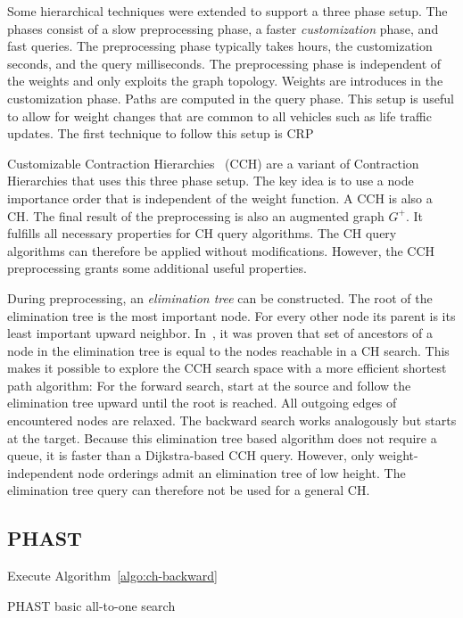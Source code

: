 \documentclass[manuscript,review]{acmart}
\begin{document}
Some hierarchical techniques were extended to support a three phase setup.
The phases consist of a slow preprocessing phase, a faster \emph{customization} phase, and fast queries.
The preprocessing phase typically takes hours, the customization seconds, and the query milliseconds.
The preprocessing phase is independent of the weights and only exploits the graph topology.
Weights are introduces in the customization phase.
Paths are computed in the query phase.
This setup is useful to allow for weight changes that are common to all vehicles such as life traffic updates.
The first technique to follow this setup is CRP~\cite{dgpw-crprn-13}

Customizable Contraction Hierarchies~\cite{dsw-cch-15} (CCH) are a variant of Contraction Hierarchies that uses this three phase setup.
The key idea is to use a node importance order that is independent of the weight function.
A CCH is also a CH.
The final result of the preprocessing is also an augmented graph $G^+$.
It fulfills all necessary properties for CH query algorithms.
The CH query algorithms can therefore be applied without modifications.
However, the CCH preprocessing grants some additional useful properties.

During preprocessing, an \emph{elimination tree} can be constructed.
The root of the elimination tree is the most important node.
For every other node its parent is its least important upward neighbor.
In~\cite{bcrw-s-16}, it was proven that set of ancestors of a node in the elimination tree is equal to the nodes reachable in a CH search.
This makes it possible to explore the CCH search space with a more efficient shortest path algorithm:
For the forward search, start at the source and follow the elimination tree upward until the root is reached.
All outgoing edges of encountered nodes are relaxed.
The backward search works analogously but starts at the target.
Because this elimination tree based algorithm does not require a queue, it is faster than a Dijkstra-based CCH query.
However, only weight-independent node orderings admit an elimination tree of low height.
The elimination tree query can therefore not be used for a general CH.

\subsection{PHAST}

\begin{algorithm2e}
Execute Algorithm~\ref{algo:ch-backward}\;
\caption{PHAST basic all-to-one search}
\label{algo:phast}
\end{algorithm2e}
\end{document}
